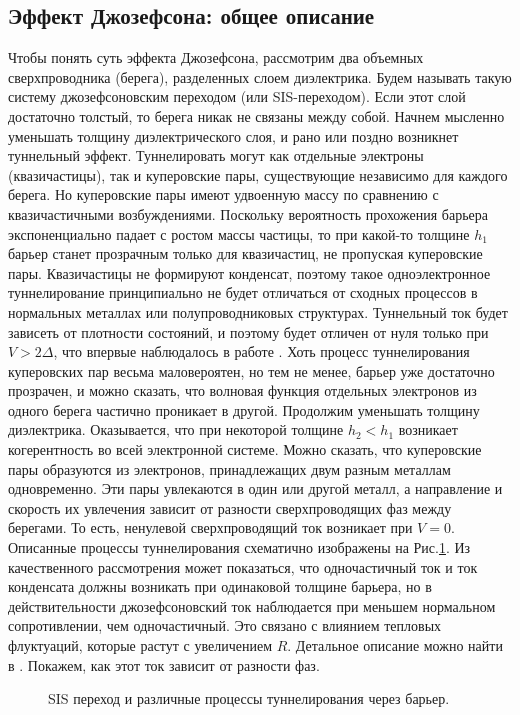 \subsection{Эффект Джозефсона: общее описание}
Чтобы понять суть эффекта Джозефсона, рассмотрим два объемных сверхпроводника (берега), разделенных слоем диэлектрика. Будем называть такую систему джозефсоновским переходом (или SIS-переходом). Если этот слой достаточно толстый, то берега никак не связаны между собой. Начнем мысленно уменьшать толщину диэлектрического слоя, и рано или поздно возникнет туннельный эффект. Туннелировать могут как отдельные электроны (квазичастицы), так и куперовские пары, существующие независимо для каждого берега. Но куперовские пары имеют удвоенную массу по сравнению с квазичастичными возбуждениями. Поскольку вероятность прохожения барьера экспоненциально падает с ростом массы частицы, то при какой-то толщине $h_1$ барьер станет прозрачным только для квазичастиц, не пропуская куперовские пары. Квазичастицы не формируют конденсат, поэтому такое одноэлектронное туннелирование принципиально не будет отличаться от сходных процессов в нормальных металлах или полупроводниковых структурах. Туннельный ток будет зависеть от плотности состояний, и поэтому будет отличен от нуля только при $V\!>\!2\Delta$, что впервые наблюдалось в работе \cite{GiaeverGap}. Хоть процесс туннелирования куперовских пар весьма маловероятен, но тем не менее, барьер уже достаточно прозрачен, и можно сказать, что волновая функция отдельных электронов из одного берега частично проникает в другой. Продолжим уменьшать толщину диэлектрика. Оказывается, что при некоторой толщине $h_2\!<\!h_1$ возникает когерентность во всей электронной системе. Можно сказать, что куперовские пары образуются из электронов, принадлежащих двум разным металлам одновременно. Эти пары увлекаются в один или другой металл, а направление и  скорость их увлечения зависит от разности сверхпроводящих фаз между берегами. То есть, ненулевой сверхпроводящий ток возникает при $V\!=\!0$. Описанные процессы туннелирования схематично изображены на Рис.\:\ref{img:jj_tunn}. Из качественного рассмотрения может показаться, что одночастичный ток и ток конденсата должны возникать при одинаковой толщине барьера, но в действительности джозефсоновский ток наблюдается при меньшем нормальном сопротивлении, чем одночастичный. Это связано с влиянием тепловых флуктуаций, которые растут с увеличением $R$. Детальное описание можно найти в \cite{Barone}. Покажем, как этот ток зависит от разности фаз.
\begin{figure}
{\centering 
\hfill
\fontsize{22pt}{22pt}\selectfont
\def\svgwidth{3.5in}%

\hfill
}
\caption{SIS переход и различные процессы туннелирования через барьер.}
\label{img:jj_tunn}
\end{figure}
